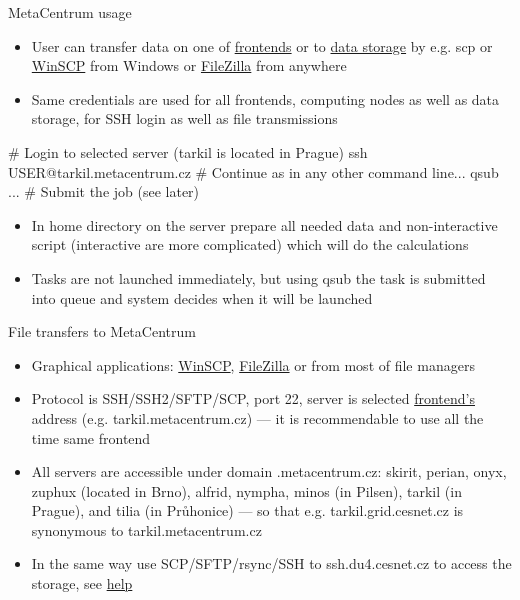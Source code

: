 \documentclass[compress, ucs, xelatex, 11pt, xcolor=x11names, aspectratio=169,
	hyperref={
		bookmarks=true,
		unicode=true,
		colorlinks=true,
		pdftitle={HybSeq course},
		plainpages=false,
		pdfauthor={Vojtech Zeisek},
		pdfsubject={Practical processing of HybSeq target enrichment sequencing data on computing grids like MetaCentrum},
		pdfcreator={XeLaTeX},
		pdfkeywords={BASH, command line, GNU, HybSeq, Linux, MetaCentrum, sequencing shell, target enrichment},
		linkcolor=Cyan2, %
		anchorcolor=Firebrick2, %
		citecolor=Firebrick2, %
		filecolor=Firebrick2, %
		menucolor=Firebrick2, %
		urlcolor=Chartreuse2, %
		pdftex},
	url={hyphens, lowtilde} %
	]{beamer}
\renewcommand{\texttt}[1]{\colorbox{Snow4}{{\ttfamily #1}}}
\begin{document}
\begin{frame}[fragile]{MetaCentrum usage}
	\begin{itemize}
		\item User can transfer data on one of \href{https://wiki.metacentrum.cz/wiki/Frontend}{frontends} or to \href{https://du.cesnet.cz/en/prehled_protokolu_a_sluzeb_s_jejich_doporucenimi/start#protocol}{data storage} by e.g. \texttt{scp} or \href{https://winscp.net/}{WinSCP} from Windows or \href{https://filezilla-project.org/}{FileZilla} from anywhere
		\item Same credentials are used for all frontends, computing nodes as well as data storage, for SSH login as well as file transmissions
	\end{itemize}
	\vfill
	\begin{bashcode}
    # Login to selected server (tarkil is located in Prague)
    ssh USER@tarkil.metacentrum.cz
    # Continue as in any other command line...
    qsub ... # Submit the job (see later)
	\end{bashcode}
	\vfill
	\begin{itemize}
		\item In home directory on the server prepare all needed data and non-interactive script (interactive are more complicated) which will do the calculations
		\item Tasks are not launched immediately, but using \texttt{qsub} the task is submitted into queue and system decides when it will be launched
	\end{itemize}
\end{frame}

\begin{frame}{File transfers to MetaCentrum}
	\begin{itemize}
		\item Graphical applications: \href{https://winscp.net/}{WinSCP}, \href{https://filezilla-project.org/}{FileZilla} or from most of file managers
		\item Protocol is SSH/SSH2/SFTP/SCP, port 22, server is selected \href{https://wiki.metacentrum.cz/wiki/Frontend}{frontend's} address (e.g. \texttt{tarkil.metacentrum.cz}) --- it is recommendable to use all the time same frontend
		\item All servers are accessible under domain \texttt{*.metacentrum.cz}: \texttt{skirit}, \texttt{perian}, \texttt{onyx}, \texttt{zuphux} (located in Brno), \texttt{alfrid}, \texttt{nympha}, \texttt{minos} (in Pilsen), \texttt{tarkil} (in Prague), and \texttt{tilia} (in Průhonice) --- so that e.g. \texttt{tarkil.grid.cesnet.cz} is synonymous to \texttt{tarkil.metacentrum.cz}
		\item In the same way use SCP/SFTP/rsync/SSH to \texttt{ssh.du4.cesnet.cz} to access the storage, see \href{https://du.cesnet.cz/en/prehled_protokolu_a_sluzeb_s_jejich_doporucenimi/start\#protocol}{help}
	\end{itemize}
\end{frame}
\end{document}
